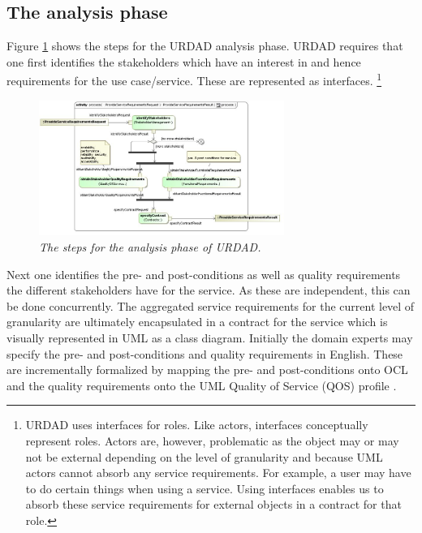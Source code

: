 
\subsection{The analysis phase}

Figure \ref{fig:urdadAnalysis} shows the steps for the URDAD analysis phase.
URDAD requires that one first identifies the stakeholders
which have an interest in and hence requirements for the use case/service. These
are represented as interfaces. 
\footnote{URDAD uses interfaces for roles. Like actors, interfaces
conceptually represent roles. Actors are, however, problematic as the object may or may not
be external depending on the level of granularity and because UML actors cannot absorb 
any service requirements. For example, a user may have to do certain things when
using a service. Using interfaces enables us to absorb these service requirements
for external objects in a contract for that role.}


\begin{figure}[ht!]
  \begin{center}
    \includegraphics[width=8cm]{urdadAnalysis}
    \caption{\it The steps for the analysis phase of URDAD.}
    \label{fig:urdadAnalysis}
  \end{center}
\end{figure}


Next one identifies the pre- and post-conditions as well
as quality requirements the different stakeholders have for the service. As these
are independent, this can be done concurrently. The aggregated service requirements 
for the current level of granularity are ultimately encapsulated in a contract for
the service which is visually represented in UML as a class diagram.
Initially the domain experts may specify the pre- and post-conditions and quality
requirements in English. These are incrementally formalized by mapping the pre-
and post-conditions onto OCL  and the quality requirements onto the UML Quality of
Service (QOS) profile \cite{omg:qualityOfService}.

